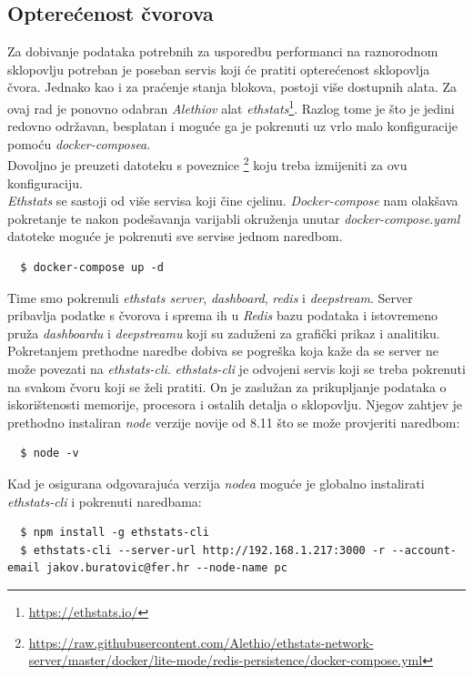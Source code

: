\documentclass[times, utf8, zavrsni, numeric]{fer}
\begin{document}
\subsection{Opterećenost čvorova}
Za dobivanje podataka potrebnih za usporedbu performanci na raznorodnom sklopovlju potreban je poseban servis koji će pratiti
opterećenost sklopovlja čvora. Jednako kao i za praćenje stanja blokova, postoji više dostupnih alata. Za ovaj rad je ponovno
odabran \emph{Alethiov} alat \emph{ethstats}\footnote{\url{https://ethstats.io/}}. Razlog tome je što je jedini redovno održavan, besplatan i moguće ga je pokrenuti
uz vrlo malo konfiguracije pomoću \emph{docker-composea}. \\
Dovoljno je preuzeti datoteku s poveznice
 \footnote{\url{https://raw.githubusercontent.com/Alethio/ethstats-network-server/master/docker/lite-mode/redis-persistence/docker-compose.yml}} koju 
 treba izmijeniti za ovu konfiguraciju. \\
\emph{Ethstats} se sastoji od više servisa koji čine cjelinu. \emph{Docker-compose} nam olakšava pokretanje te nakon podešavanja
varijabli okruženja unutar \emph{docker-compose.yaml} datoteke moguće je pokrenuti sve servise jednom naredbom.
\begin{lstlisting}
  $ docker-compose up -d
\end{lstlisting}
Time smo pokrenuli \emph{ethstats server}, \emph{dashboard}, \emph{redis} i \emph{deepstream}.
Server pribavlja podatke s čvorova i sprema ih u \emph{Redis} bazu podataka i istovremeno pruža \emph{dashboardu} i \emph{deepstreamu} koji
su zaduženi za grafički prikaz i analitiku. \\
Pokretanjem prethodne naredbe dobiva se pogreška koja kaže da se server ne može povezati na \emph{ethstats-cli}. \emph{ethstats-cli} 
je odvojeni servis koji se treba pokrenuti na svakom čvoru koji se želi pratiti. On je zaslužan za prikupljanje podataka o iskorištenosti
memorije, procesora i ostalih detalja o sklopovlju. Njegov zahtjev je prethodno instaliran \emph{node} verzije novije od 8.11 što se može 
provjeriti naredbom:
\begin{lstlisting}
  $ node -v
\end{lstlisting}
Kad je osigurana odgovarajuća verzija \emph{nodea} moguće je globalno instalirati \emph{ethstats-cli} i pokrenuti naredbama:
\begin{lstlisting}
  $ npm install -g ethstats-cli
  $ ethstats-cli --server-url http://192.168.1.217:3000 -r --account-email jakov.buratovic@fer.hr --node-name pc
\end{lstlisting}
\end{document}
